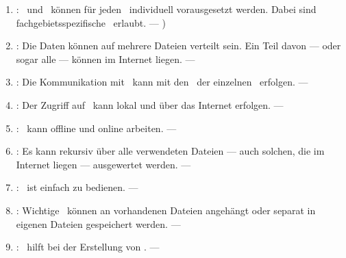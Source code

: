 \begin{enumerate}
	\item \label{Anforderung:Individualitaet} :
	\Axiome\ und \Saetze\ können für jeden \Beweis\ individuell vorausgesetzt werden.
	Dabei sind fachgebietsspezifische \Fachbegriffe\ erlaubt.
	--- )

	\item \label{Anforderung:Internet} :
	Die Daten können auf mehrere Dateien verteilt sein.
	Ein Teil davon --- oder sogar alle --- können im Internet liegen.
	--- 

	\item \label{Anforderung:Kommunikation} :
	Die Kommunikation mit \ASBA\ kann mit den \Fachbegriffen\ der einzelnen \Fachgebiete\ erfolgen.
	--- 

	\item \label{Anforderung:Zugriff} :
	Der Zugriff auf \ASBA\ kann lokal und über das Internet erfolgen.
	--- 

	\item \label{Anforderung:Unabhaengigkeit} :
	\ASBA\ kann offline und online arbeiten.
	--- 

	\item \label{Anforderung:Rekursion} :
	Es kann rekursiv über alle verwendeten Dateien --- auch solchen, die im Internet liegen --- ausgewertet werden.
	--- 

	\item \label{Anforderung:Bedienbarkeit} :
	\ASBA\ ist einfach zu bedienen.
	--- 

	\item \label{Anforderung:Zwischenspeicher} :
	Wichtige \Auswertungen\ können an vorhandenen Dateien angehängt oder separat in eigenen Dateien gespeichert werden.
	--- 

	\item \label{Anforderung:Beweisunterstuetzung} :
	\ASBA\ hilft bei der Erstellung von \Beweisen.
	--- 

\end{enumerate}

\section[Axiome]{\Axiome}%
\beginsection   {\Axiome}
\label       {sec:Axiome}

